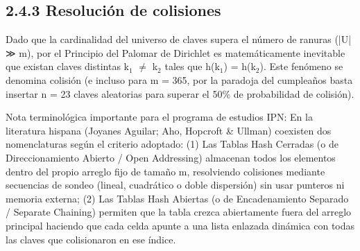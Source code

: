 \documentclass[11pt,letterpaper]{article}
\begin{document}
\subsection*{2.4.3 Resolución de colisiones}
Dado que la cardinalidad del universo de claves supera el número de ranuras (|U| ≫ m), por el Principio del Palomar de Dirichlet es matemáticamente inevitable que existan claves distintas k$_1$ $\neq$ k$_2$ tales que h(k$_1$) = h(k$_2$). Este fenómeno se denomina colisión (e incluso para m = 365, por la paradoja del cumpleaños basta insertar n = 23 claves aleatorias para superar el 50\% de probabilidad de colisión).\par
Nota terminológica importante para el programa de estudios IPN: En la literatura hispana (Joyanes Aguilar; Aho, Hopcroft \& Ullman) coexisten dos nomenclaturas según el criterio adoptado: (1) Las Tablas Hash Cerradas (o de Direccionamiento Abierto / Open Addressing) almacenan todos los elementos dentro del propio arreglo fijo de tamaño m, resolviendo colisiones mediante secuencias de sondeo (lineal, cuadrático o doble dispersión) sin usar punteros ni memoria externa; (2) Las Tablas Hash Abiertas (o de Encadenamiento Separado / Separate Chaining) permiten que la tabla crezca abiertamente fuera del arreglo principal haciendo que cada celda apunte a una lista enlazada dinámica con todas las claves que colisionaron en ese índice.\par
\end{document}
